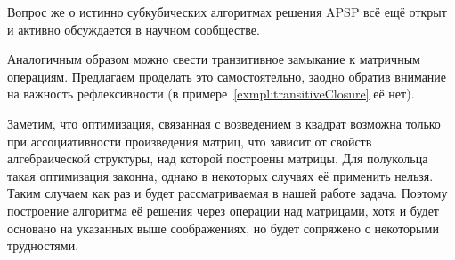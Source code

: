  Вопрос же о истинно субкубических алгоритмах решения APSP всё ещё открыт~ и активно обсуждается в научном сообществе.

 Аналогичным образом можно свести транзитивное замыкание к матричным операциям.
 Предлагаем проделать это самостоятельно, заодно обратив внимание на важность рефлексивности (в примере~\ref{exmpl:transitiveClosure} её нет).

 Заметим, что оптимизация, связанная с возведением в квадрат возможна только при ассоциативности произведения матриц, что зависит от свойств алгебраической структуры, над которой построены матрицы.
 Для полукольца такая оптимизация законна, однако в некоторых случаях её применить нельзя.
 Таким случаем как раз и будет рассматриваемая в нашей работе задача.
 Поэтому построение алгоритма её решения через операции над матрицами, хотя и будет основано на указанных выше соображениях, но будет сопряжено с некоторыми трудностями.

